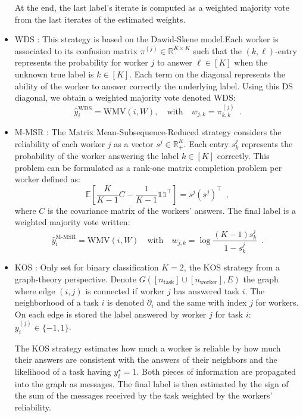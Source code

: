 \documentclass{cap2024}
\begin{document}
\begin{itemize}
    At the end, the last label's iterate is computed as a weighted majority vote from the last iterates of the estimated weights.

  \item WDS \citep{dawid_maximum_1979}: This strategy is based on the Dawid-Skene model.Each worker is associated to its confusion matrix $\pi^{(j)}\in\mathbb{R}^{K\times K}$ such that the $(k,\ell)$-entry represents the probability for worker $j$ to answer $\ell\in[K]$ when the unknown true label is $k\in[K]$. Each term on the diagonal represents the ability of the worker to answer correctly the underlying label.
  Using this DS diagonal, we obtain a weighted majority vote denoted WDS:
  \begin{equation}
    \hat{y}_i^\text{WDS}= \mathrm{WMV}\left(i, W\right),\quad
    \text{with}\quad w_{j,k} = \pi^{(j)}_{k,k}\enspace.
  \end{equation}
  \item M-MSR \citep{ma2020adversarial}: The Matrix Mean-Subsequence-Reduced strategy considers the reliability of each worker $j$ as a vector $s^j\in\mathbb{R}^K_+$. Each entry $s^j_k$ represents the probability of the worker answering the label $k\in[K]$ correctly.
  This problem can be formulated as a rank-one matrix completion problem per worker defined as:
  \[\mathbb{E}\left[\frac{K}{K-1}C - \frac{1}{K-1}\mathds{1}\mathds{1}^\top\right]=s^j(s^j)^\top \enspace,\]
  where $C$ is the covariance matrix of the workers' answers.
  The final label is a weighted majority vote written:
  \begin{equation}
    \hat y_i^{\text{M-MSR}} = \mathrm{WMV}(i, W)\quad \text{with}\quad w_{j,k}=\log\frac{(K-1)s^j_k}{1-s^j_k}\enspace.
  \end{equation}
  \item KOS \citep{karger2011iterative}: Only set for binary classification $K=2$, the KOS strategy from a graph-theory perspective.
  Denote $G([n_\text{task}]\cup [n_\text{worker}], E)$ the graph where edge $(i,j)$ is connected if worker $j$ has answered task $i$. The neighborhood of a task $i$ is denoted $\partial_i$ and the same with index $j$ for workers.
  On each edge is stored the label answered by worker $j$ for task $i$: $y_i^{(j)}\in\{-1,1\}$.

  The KOS strategy estimates how much a worker is reliable by how much their answers are consistent with the answers of their neighbors and the likelihood of a task having $y_i^\star=1$.
  Both pieces of information are propagated into the graph as messages.
  The final label is then estimated by the sign of the sum of the messages received by the task weighted by the workers' reliability.


\end{itemize}
\end{document}
